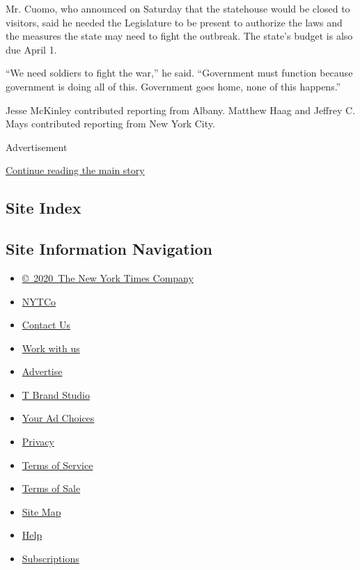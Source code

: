 Mr. Cuomo, who announced on Saturday that the statehouse would be closed
to visitors, said he needed the Legislature to be present to authorize
the laws and the measures the state may need to fight the outbreak. The
state's budget is also due April 1.

``We need soldiers to fight the war,'' he said. ``Government must
function because government is doing all of this. Government goes home,
none of this happens.''

Jesse McKinley contributed reporting from Albany. Matthew Haag and
Jeffrey C. Mays contributed reporting from New York City.

Advertisement

\protect\hyperlink{after-bottom}{Continue reading the main story}

\hypertarget{site-index}{%
\subsection{Site Index}\label{site-index}}

\hypertarget{site-information-navigation}{%
\subsection{Site Information
Navigation}\label{site-information-navigation}}

\begin{itemize}
\tightlist
\item
  \href{https://help.nytimes3xbfgragh.onion/hc/en-us/articles/115014792127-Copyright-notice}{©~2020~The
  New York Times Company}
\end{itemize}

\begin{itemize}
\tightlist
\item
  \href{https://www.nytco.com/}{NYTCo}
\item
  \href{https://help.nytimes3xbfgragh.onion/hc/en-us/articles/115015385887-Contact-Us}{Contact
  Us}
\item
  \href{https://www.nytco.com/careers/}{Work with us}
\item
  \href{https://nytmediakit.com/}{Advertise}
\item
  \href{http://www.tbrandstudio.com/}{T Brand Studio}
\item
  \href{https://www.nytimes3xbfgragh.onion/privacy/cookie-policy\#how-do-i-manage-trackers}{Your
  Ad Choices}
\item
  \href{https://www.nytimes3xbfgragh.onion/privacy}{Privacy}
\item
  \href{https://help.nytimes3xbfgragh.onion/hc/en-us/articles/115014893428-Terms-of-service}{Terms
  of Service}
\item
  \href{https://help.nytimes3xbfgragh.onion/hc/en-us/articles/115014893968-Terms-of-sale}{Terms
  of Sale}
\item
  \href{https://spiderbites.nytimes3xbfgragh.onion}{Site Map}
\item
  \href{https://help.nytimes3xbfgragh.onion/hc/en-us}{Help}
\item
  \href{https://www.nytimes3xbfgragh.onion/subscription?campaignId=37WXW}{Subscriptions}
\end{itemize}
